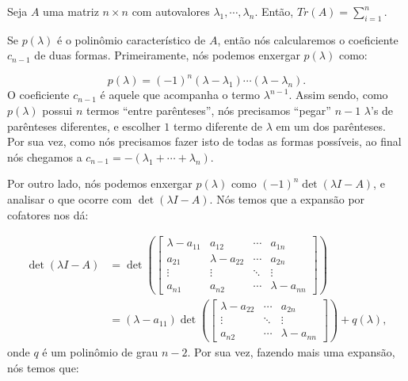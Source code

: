 \begin{Proposition}
	Seja $A$ uma matriz $n\times n$ com autovalores $\lambda_1, \cdots, \lambda_n$. Então, $Tr(A) = \sum\limits_{i = 1}^{n}$.
\end{Proposition}

\begin{Proof}
	Se $p(\lambda)$ é o polinômio característico de $A$, então nós calcularemos o coeficiente $c_{n - 1}$ de duas formas. Primeiramente, nós podemos enxergar $p(\lambda)$ como:
	
	$$
	p(\lambda) = (-1)^n(\lambda - \lambda_1)\cdots(\lambda - \lambda_n).
	$$
	O coeficiente $c_{n - 1}$ é aquele que acompanha o termo $\lambda^{n - 1}$. Assim sendo, como $p(\lambda)$ possui $n$ termos ``entre parênteses'', nós precisamos ``pegar'' $n - 1$ $\lambda$'s de parênteses diferentes, e escolher $1$ termo diferente de $\lambda$ em um dos parênteses. Por sua vez, como nós precisamos fazer isto de todas as formas possíveis, ao final nós chegamos a $c_{n - 1} = - (\lambda_1 + \cdots + \lambda_n)$.
	
	Por outro lado, nós podemos enxergar $p(\lambda)$ como $(-1)^n\det(\lambda I - A)$, e analisar o que ocorre com $\det(\lambda I - A)$. Nós temos que a expansão por cofatores nos dá:
	
	\begin{align*}
		\det(\lambda I - A) &= \det\left(\begin{bmatrix}
			\lambda - a_{11} & a_{12} & \cdots & a_{1n} \\
			a_{21} & \lambda - a_{22} & \cdots & a_{2n} \\
			\vdots & \vdots & \ddots & \vdots \\
			a_{n1} & a_{n2} & \cdots & \lambda - a_{nn}
		\end{bmatrix}\right)\\ &= (\lambda - a_{11})\det\left(\begin{bmatrix}
			\lambda - a_{22} & \cdots & a_{2n} \\
			\vdots & \ddots & \vdots \\
			a_{n2} & \cdots & \lambda - a_{nn}
		\end{bmatrix}\right) + q(\lambda),
	\end{align*}
	onde $q$ é um polinômio de grau $n - 2$. Por sua vez, fazendo mais uma expansão, nós temos que:
	

\end{Proof}
